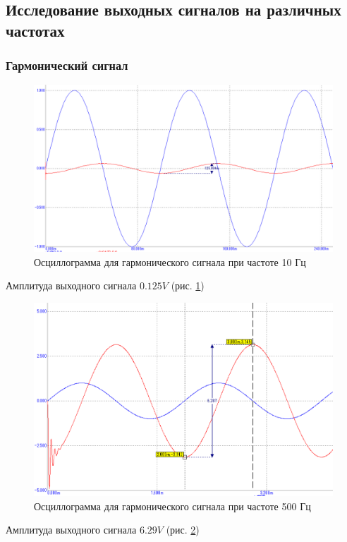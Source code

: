 \documentclass[a4paper,14pt]{article}
\begin{document}
\subsection{Исследование выходных сигналов на различных частотах}

\subsubsection{Гармонический сигнал}

\begin{figure}[H]
	\centering
	\includegraphics[width=0.9\linewidth]{../imgs/tran_sin_10Hz_diff}
	\caption{Осциллограмма для гармонического сигнала при частоте 10 Гц}
	\label{fig:tran_sin_10Hz_diff}
\end{figure}

Амплитуда выходного сигнала $0.125V$ (рис. \ref{fig:tran_sin_10Hz_diff})

\begin{figure}[H]
	\centering
	\includegraphics[width=0.7\linewidth]{../imgs/tran_sin_500Hz_diff}
	\caption{Осциллограмма для гармонического сигнала при частоте 500 Гц}
	\label{fig:tran_sin_500Hz_diff}
\end{figure}

Амплитуда выходного сигнала $6.29V$ (рис. \ref{fig:tran_sin_500Hz_diff})
\end{document}
